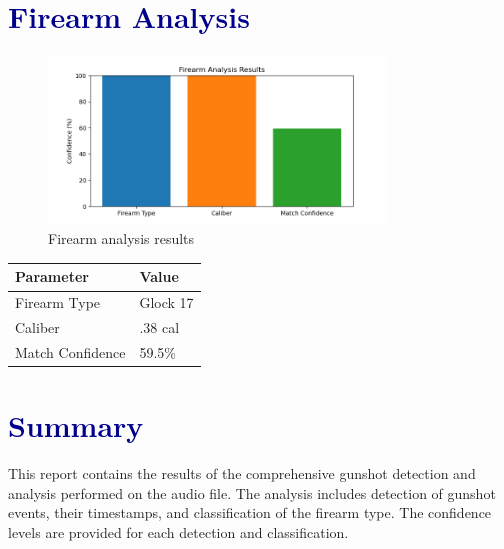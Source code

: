 \documentclass{article}
\begin{document}
\section*{\textcolor{darkblue}{Firearm Analysis}}
\begin{figure}[h]
\centering
\includegraphics[width=0.8\textwidth]{firearm_analysis_20250428_233129.png}
\caption{Firearm analysis results}
\end{figure}
\begin{table}[h]
\centering
\begin{tabular}{ll}
\toprule
\textbf{Parameter} & \textbf{Value} \\
\midrule
Firearm Type & Glock 17 \\
Caliber & .38 cal \\
Match Confidence & 59.5\% \\
\bottomrule
\end{tabular}
\end{table}

\section*{\textcolor{darkblue}{Summary}}
This report contains the results of the comprehensive gunshot detection and analysis performed on the audio file. The analysis includes detection of gunshot events, their timestamps, and classification of the firearm type. The confidence levels are provided for each detection and classification.
\end{document}
